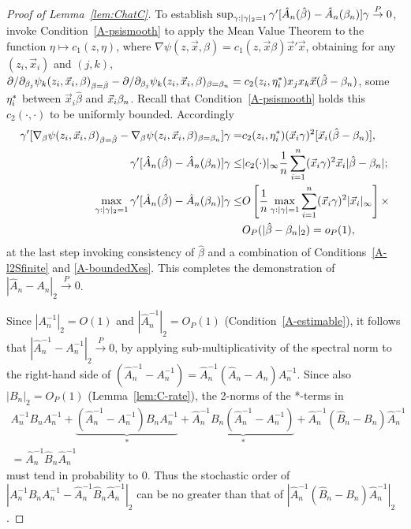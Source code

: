 \documentclass{article}
\theoremstyle{remark}
\begin{document}
\begin{proof}[Proof of Lemma~\ref{lem:ChatC}]
To establish $\sup_{\gamma: |\gamma|_{2}=1}\gamma'[\hat{A}_{n}(\hat\beta) - \hat{A}_{n}(\beta_{n }) ]\gamma  \stackrel{P}{\rightarrow} 0$,  invoke Condition~\ref{A-psismooth} to apply the Mean Value Theorem to the function $\eta \mapsto c_{1}(z, \eta)$, where $\nabla \psi(z, \vec{x}, \beta)  = c_{1}(z, \vec{x}\beta) \vec{x}'\vec{x}$, obtaining for any $(z_{i}, \vec{x}_{i})$ and $(j,k)$, $\partial/\partial_{\beta_{j}}\psi_{k}(z_{i}, \vec{x}_{i},\beta)_{\beta = \hat\beta} - \partial/\partial_{\beta_{j}}\psi_{k}(z_{i}, \vec{x}_{i}, \beta)_{\beta = \beta_{n }}  =  c_{2}(z_{i}, \eta^*_{i})x_{j}x_{k}\vec{x}(\hat\beta - \beta_{n })$, some $\eta^*_{i}$ between $\vec{x}_{i}\hat\beta$ and $\vec{x}_{i}\beta_{n }$. Recall that Condition~\ref{A-psismooth} holds this $c_{2}(\cdot, \cdot)$ to be uniformly bounded. Accordingly
\begin{align}
  \gamma'[\nabla_{\beta} \psi(z_{i}, \vec{x}_{i},\beta)_{\beta = \hat\beta} - \nabla_{\beta} \psi (z_{i}, \vec{x}_{i},\beta)_{\beta = \beta_{n }}]\gamma =& c_{2}(z_{i}, \eta^*_{i}) (\vec{x}_{i}\gamma)^{2} [\vec{x}_{i}(\hat\beta - \beta_{n })], \nonumber \\
\gamma'[\hat{A}_{n}(\hat\beta) - \hat{A}_{n}(\beta_{n }) ]\gamma \leq & |c_{2}(\cdot)|_{\infty}\frac{1}{n} \sum_{i=1}^{n}(\vec{x}_{i}\gamma)^{2}\vec{x}_{i} |\hat\beta - \beta_{n }| \label{eq:21};\\
\max_{\gamma: |\gamma|_{2}=1} \gamma'[\hat{A}_{n}(\hat\beta) - \hat{A}_{n}(\beta_{n }) ]\gamma \leq & O \left[\frac{1}{n} 
\max_{\gamma :|\gamma|=1} \sum_{i=1}^{n}(\vec{x}_{i}\gamma)^{2}|\vec{x}_{i}|_{\infty} 
\right] \times  \nonumber \\
& O_{P}(|\hat\beta - \beta_{n } |_{2})   = o_{P}(1), \nonumber
\end{align}
at the last step invoking consistency of $\hat\beta$ and a combination of Conditions~\ref{A-l2Sfinite} and \ref{A-boundedXes}. This completes the demonstration of $|\hat{A}_{n} - A_{n}|_{2} \stackrel{P}{\rightarrow} 0$.

Since $|{A}_{n}^{-1}|_{2}=O(1)$ and $|\hat{A}_{n}^{-1}|_{2}= O_{P}(1)$ (Condition~\ref{A-estimable}), it follows that $|\hat{A}_{n}^{-1} - A_{n}^{-1}|_{2} \stackrel{P}{\rightarrow} 0$, by applying sub-multiplicativity of the spectral norm to the right-hand side of 
$(\hat{A}_{n}^{-1} - A_{n}^{-1}) = \hat{A}_{n}^{-1} (\hat{A}_{n} - A_{n}) {A}_{n}^{-1}$.  Since also $|B_{n}|_{2} = O_{P}(1)$ (Lemma~\ref{lem:C-rate}), 
the 2-norms of the *-terms in 
\begin{multline*}
  A_{n}^{-1}B_{n}A_{n}^{-1}  + \underbrace{(\hat{A}_{n}^{-1} - A_{n}^{-1})B_{n}A_{n}^{-1}}_{*} + \underbrace{\hat{A}_{n}^{-1}B_{n}(\hat{A}_{n}^{-1} - A_{n}^{-1})}_{*}   + \hat{A}_{n}^{-1}(\hat{B}_{n} - B_{n})\hat{A}_{n}^{-1}  \\[-2ex]
=  \hat{A}_{n}^{-1}\hat{B}_{n}\hat{A}_{n}^{-1}
\end{multline*}
must tend in probability to 0.  Thus the stochastic order of $|A_{n}^{-1}B_{n}A_{n}^{-1} - \hat{A}_{n}^{-1}\hat{B}_{n}\hat{A}_{n}^{-1}|_{2}$ can be no greater than that of $|\hat{A}_{n}^{-1}(\hat{B}_{n} - B_{n}) \hat{A}_{n}^{-1}|_{2}$.  


\end{proof}
\end{document}
